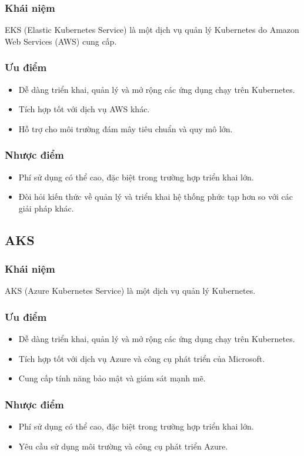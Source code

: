 \subsubsection{Khái niệm}
\indent EKS (Elastic Kubernetes Service) là một dịch vụ quản lý Kubernetes do Amazon Web Services (AWS) cung cấp.
\subsubsection{Ưu điểm}
\begin{itemize}
    \item Dễ dàng triển khai, quản lý và mở rộng các ứng dụng chạy trên Kubernetes.
    \item Tích hợp tốt với dịch vụ AWS khác.
    \item Hỗ trợ cho môi trường đám mây tiêu chuẩn và quy mô lớn.
\end{itemize}
\subsubsection{Nhược điểm}
\begin{itemize}
    \item Phí sử dụng có thể cao, đặc biệt trong trường hợp triển khai lớn.
    \item Đòi hỏi kiến thức về quản lý và triển khai hệ thống phức tạp hơn so với các giải pháp khác.
\end{itemize}
\subsection{AKS}
\subsubsection{Khái niệm}
\indent AKS (Azure Kubernetes Service) là một dịch vụ quản lý Kubernetes.

\subsubsection{Ưu điểm}
\begin{itemize}
    \item Dễ dàng triển khai, quản lý và mở rộng các ứng dụng chạy trên Kubernetes.
    \item Tích hợp tốt với dịch vụ Azure và công cụ phát triển của Microsoft.
    \item Cung cấp tính năng bảo mật và giám sát mạnh mẽ.
\end{itemize}
\subsubsection{Nhược điểm}
\begin{itemize}
    \item Phí sử dụng có thể cao, đặc biệt trong trường hợp triển khai lớn.
    \item Yêu cầu sử dụng môi trường và công cụ phát triển Azure.
\end{itemize}
